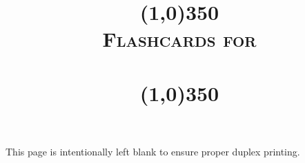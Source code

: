 \documentclass[a4_a7,grid]{flashcards}
\title{\vspace{3cm}\line(1,0){350}\\\textsc{Flashcards for\\\textsc{\MyLecture}\\\line(1,0){350}}}
\begin{document}
	\maketitle
	\vspace*{\fill}
	\begin{versionhistory}
	\end{versionhistory}
	\newpage
	\restoregeometry
	\vspace*{\fill}
	\centering This page is intentionally left blank to ensure proper duplex printing.\par
	\vspace{\fill}
	\newpage

	
	
	
	
	
	
\end{document}
